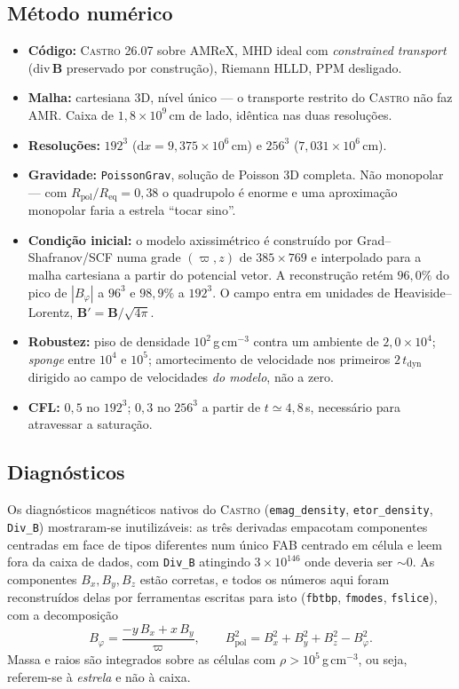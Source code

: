 \documentclass[11pt,a4paper]{article}
\newcommand{\Req}{R_{\mathrm{eq}}}
\newcommand{\Rpol}{R_{\mathrm{pol}}}
\newcommand{\Btor}{B_\varphi}
\begin{document}
\subsection{Método numérico}

\begin{itemize}\itemsep2pt
\item \textbf{Código:} \textsc{Castro} 26.07 sobre AMReX, MHD ideal com
      \emph{constrained transport} (div$\,\mathbf{B}$ preservado por
      construção), Riemann HLLD, PPM desligado.
\item \textbf{Malha:} cartesiana 3D, nível único --- o transporte restrito do
      \textsc{Castro} não faz AMR. Caixa de $1{,}8\times10^9$\,cm de lado,
      idêntica nas duas resoluções.
\item \textbf{Resoluções:} $192^3$ ($\mathrm{d}x = 9{,}375\times10^6$\,cm) e
      $256^3$ ($7{,}031\times10^6$\,cm).
\item \textbf{Gravidade:} \texttt{PoissonGrav}, solução de Poisson 3D completa.
      Não monopolar --- com $\Rpol/\Req = 0{,}38$ o quadrupolo é enorme e uma
      aproximação monopolar faria a estrela ``tocar sino''.
\item \textbf{Condição inicial:} o modelo axissimétrico é construído por
      Grad--Shafranov/SCF numa grade $(\varpi,z)$ de $385\times769$ e
      interpolado para a malha cartesiana a partir do potencial vetor. A
      reconstrução retém $96{,}0\%$ do pico de $|\Btor|$ a $96^3$ e $98{,}9\%$ a
      $192^3$. O campo entra em unidades de Heaviside--Lorentz,
      $\mathbf{B}' = \mathbf{B}/\sqrt{4\pi}$.
\item \textbf{Robustez:} piso de densidade $10^2$\,g\,cm$^{-3}$ contra um
      ambiente de $2{,}0\times10^4$; \emph{sponge} entre $10^4$ e $10^5$;
      amortecimento de velocidade nos primeiros $2\,t_{\mathrm{dyn}}$ dirigido ao
      campo de velocidades \emph{do modelo}, não a zero.
\item \textbf{CFL:} $0{,}5$ no $192^3$; $0{,}3$ no $256^3$ a partir de
      $t \simeq 4{,}8$\,s, necessário para atravessar a saturação.
\end{itemize}

\subsection{Diagnósticos}

Os diagnósticos magnéticos nativos do \textsc{Castro} (\texttt{emag\_density},
\texttt{etor\_density}, \texttt{Div\_B}) mostraram-se inutilizáveis: as três
derivadas empacotam componentes centradas em face de tipos diferentes num único
FAB centrado em célula e leem fora da caixa de dados, com \texttt{Div\_B}
atingindo $3\times10^{146}$ onde deveria ser $\sim0$. As componentes
$B_x, B_y, B_z$ estão corretas, e todos os números aqui foram reconstruídos
delas por ferramentas escritas para isto (\texttt{fbtbp}, \texttt{fmodes},
\texttt{fslice}), com a decomposição
\[
\Btor = \frac{-y\,B_x + x\,B_y}{\varpi}, \qquad
B_{\mathrm{pol}}^2 = B_x^2 + B_y^2 + B_z^2 - \Btor^2 .
\]
Massa e raios são integrados sobre as células com
$\rho > 10^5$\,g\,cm$^{-3}$, ou seja, referem-se à \emph{estrela} e não à caixa.
\end{document}
